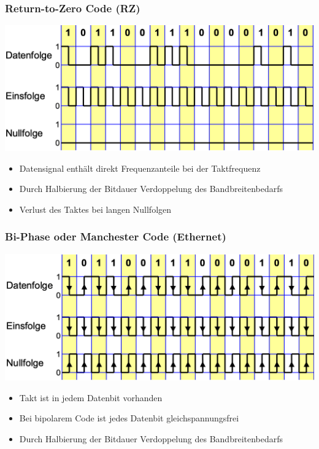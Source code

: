 \subsubsection{Return-to-Zero Code (RZ)}
\begin{center}
    \includegraphics[width=\linewidth]{graphic/signale_analyisieren/Return-to-Zero Code (RZ).png}
\end{center}
\vspace{-8pt}
\begin{itemize}
    \item Datensignal enthält direkt Frequenzanteile bei der Taktfrequenz
    \item Durch Halbierung der Bitdauer Verdoppelung des Bandbreitenbedarfs
    \item Verlust des Taktes bei langen Nullfolgen
\end{itemize}


\subsubsection{Bi-Phase oder Manchester Code (Ethernet)}
\begin{center}
    \includegraphics[width=\linewidth]{graphic/signale_analyisieren/Bi-Phase oder Manchester Code.png}
\end{center}
\vspace{-8pt}
\begin{itemize}
    \item Takt ist in jedem Datenbit vorhanden
    \item Bei bipolarem Code ist jedes Datenbit gleichspannungsfrei
    \item Durch Halbierung der Bitdauer Verdoppelung des Bandbreitenbedarfs
\end{itemize}

